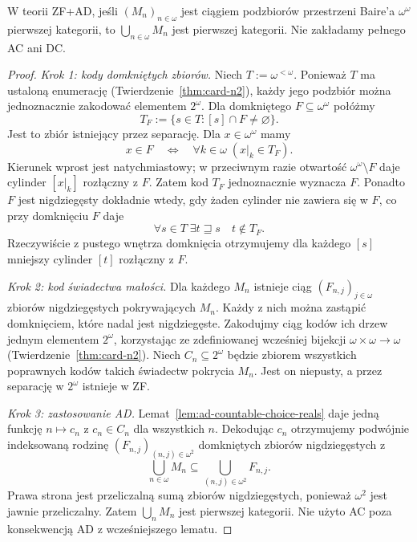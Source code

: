 \begin{lemat}
\label{lem:ad-meager-countable-union}
W teorii ZF+$\mathrm{AD}$, jeśli
$(M_n)_{n\in\omega}$ jest ciągiem
podzbiorów przestrzeni Baire'a
$\omega^\omega$ pierwszej kategorii,
to $\bigcup_{n\in\omega}M_n$
jest pierwszej kategorii.
Nie zakładamy pełnego AC ani DC.
\end{lemat}
\begin{proof}
\emph{Krok 1: kody domkniętych zbiorów.}
Niech $T:=\omega^{<\omega}$.
Ponieważ $T$ ma ustaloną enumerację
(Twierdzenie~\ref{thm:card-n2}),
każdy jego podzbiór można jednoznacznie
zakodować elementem $2^\omega$.
Dla domkniętego $F\subseteq\omega^\omega$
połóżmy
\[
T_F:=\{s\in T:[s]\cap F\ne\varnothing\}.
\]
Jest to zbiór istniejący przez separację.
Dla $x\in\omega^\omega$ mamy
\[
x\in F\quad\Longleftrightarrow\quad
\forall k\in\omega\;(x|_k\in T_F).
\]
Kierunek wprost jest natychmiastowy;
w przeciwnym razie otwartość
$\omega^\omega\setminus F$ daje
cylinder $[x|_k]$ rozłączny z $F$.
Zatem kod $T_F$ jednoznacznie wyznacza $F$.
Ponadto $F$ jest nigdziegęsty dokładnie
wtedy, gdy żaden cylinder nie zawiera się
w $F$, co przy domknięciu $F$ daje
\[
\forall s\in T\;\exists t\sqsupseteq s
\quad t\notin T_F.
\]
Rzeczywiście z pustego wnętrza
domknięcia otrzymujemy dla każdego $[s]$
mniejszy cylinder $[t]$ rozłączny z $F$.

\emph{Krok 2: kod świadectwa małości.}
Dla każdego $M_n$ istnieje ciąg
$(F_{n,j})_{j\in\omega}$ zbiorów
nigdziegęstych pokrywających $M_n$.
Każdy z nich można zastąpić
domknięciem, które nadal jest nigdziegęste.
Zakodujmy ciąg kodów ich drzew
jednym elementem $2^\omega$,
korzystając ze zdefiniowanej wcześniej
bijekcji $\omega\times\omega\to\omega$
(Twierdzenie~\ref{thm:card-n2}).
Niech $C_n\subseteq2^\omega$ będzie
zbiorem wszystkich poprawnych kodów
takich świadectw pokrycia $M_n$.
Jest on niepusty, a przez separację
w $2^\omega$ istnieje w ZF.

\emph{Krok 3: zastosowanie AD.}
Lemat~\ref{lem:ad-countable-choice-reals}
daje jedną funkcję $n\mapsto c_n$
z $c_n\in C_n$ dla wszystkich $n$.
Dekodując $c_n$ otrzymujemy podwójnie
indeksowaną rodzinę
$(F_{n,j})_{(n,j)\in\omega^2}$
domkniętych zbiorów nigdziegęstych
z
\[
\bigcup_{n\in\omega}M_n
 \subseteq\bigcup_{(n,j)\in\omega^2}F_{n,j}.
\]
Prawa strona jest przeliczalną sumą
zbiorów nigdziegęstych, ponieważ
$\omega^2$ jest jawnie przeliczalny.
Zatem $\bigcup_nM_n$ jest pierwszej kategorii.
Nie użyto AC poza konsekwencją AD
z wcześniejszego lematu.
\end{proof}

